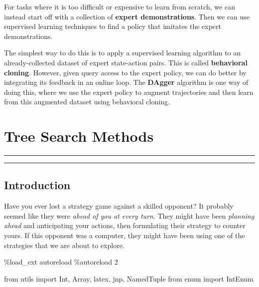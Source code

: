 \documentclass[
  letterpaper,
  DIV=11,
  numbers=noendperiod]{scrreprt}
\newenvironment{Shaded}{\begin{snugshade}}{\end{snugshade}}
\newcommand{\DecValTok}[1]{\textcolor[rgb]{0.68,0.00,0.00}{#1}}
\newcommand{\ImportTok}[1]{\textcolor[rgb]{0.00,0.46,0.62}{#1}}
\newcommand{\NormalTok}[1]{\textcolor[rgb]{0.00,0.23,0.31}{#1}}
\newcommand{\OperatorTok}[1]{\textcolor[rgb]{0.37,0.37,0.37}{#1}}
\theoremstyle{plain}
\theoremstyle{plain}
\theoremstyle{definition}
\theoremstyle{definition}
\theoremstyle{remark}
\begin{document}
For tasks where it is too difficult or expensive to learn from scratch,
we can instead start off with a collection of \textbf{expert
demonstrations}. Then we can use supervised learning techniques to find
a policy that imitates the expert demonstrations.

The simplest way to do this is to apply a supervised learning algorithm
to an already-collected dataset of expert state-action pairs. This is
called \textbf{behavioral cloning}. However, given query access to the
expert policy, we can do better by integrating its feedback in an online
loop. The \textbf{DAgger} algorithm is one way of doing this, where we
use the expert policy to augment trajectories and then learn from this
augmented dataset using behavioral cloning.


\chapter{Tree Search Methods}\label{sec-planning}

\begin{center}\rule{0.5\linewidth}{0.5pt}\end{center}

\begin{center}\rule{0.5\linewidth}{0.5pt}\end{center}

\section{Introduction}\label{introduction-8}

Have you ever lost a strategy game against a skilled opponent? It
probably seemed like they were \emph{ahead of you at every turn}. They
might have been \emph{planning ahead} and anticipating your actions,
then formulating their strategy to counter yours. If this opponent was a
computer, they might have been using one of the strategies that we are
about to explore.

\begin{Shaded}
\begin{Highlighting}[]
\OperatorTok{\%}\NormalTok{load\_ext autoreload}
\OperatorTok{\%}\NormalTok{autoreload }\DecValTok{2}
\end{Highlighting}
\end{Shaded}

\begin{Shaded}
\begin{Highlighting}[]
\ImportTok{from}\NormalTok{ utils }\ImportTok{import}\NormalTok{ Int, Array, latex, jnp, NamedTuple}
\ImportTok{from}\NormalTok{ enum }\ImportTok{import}\NormalTok{ IntEnum}
\end{Highlighting}
\end{Shaded}
\end{document}

